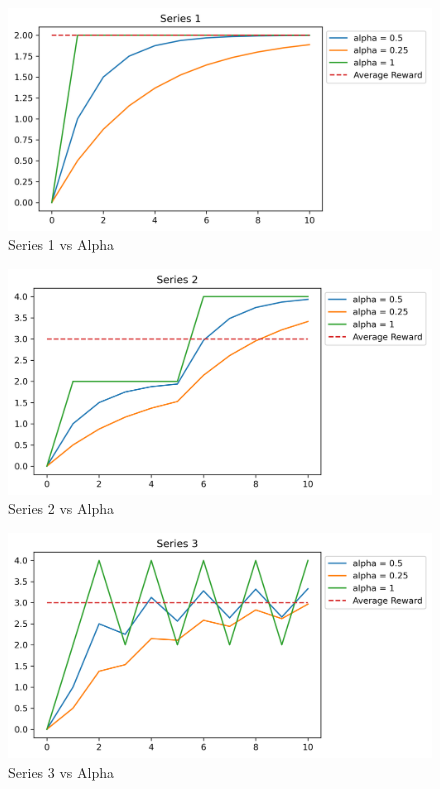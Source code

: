 \documentclass[12pt]{article}
\begin{document}
\begin{figure}
  \centering
  \includegraphics[width=\linewidth]{series_1.png}
  \caption{Series 1 vs Alpha}
  \label{fig:series-1}
\end{figure}

\begin{figure}
  \centering
  \includegraphics[width=\linewidth]{series_2.png}
  \caption{Series 2 vs Alpha}
  \label{fig:series-2}
\end{figure}

\begin{figure}
  \centering
  \includegraphics[width=\linewidth]{series_3.png}
  \caption{Series 3 vs Alpha}
  \label{fig:series-3}
\end{figure}
\end{document}
